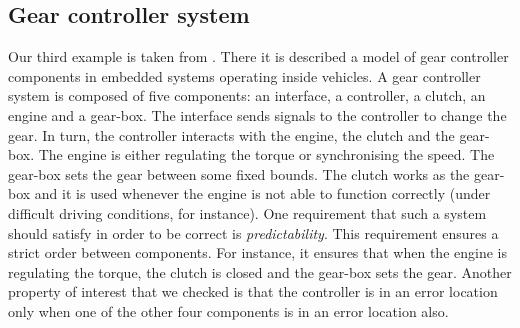 \documentclass{LMCS}
\newcommand{\mycomment}[1]{}
\theoremstyle{plain}\newtheorem{remark}[thm]{Remark}
\theoremstyle{plain}\newtheorem{example}[thm]{Example}
\begin{document}
\subsection{Gear controller system} 
Our third example is taken from \cite{gear}. There it is described a
model of gear controller components in embedded systems operating
inside vehicles. A gear controller system is composed of five
components: an interface, a controller, a clutch, an engine and a
gear-box. The interface sends signals to the controller to change the
gear. In turn, the controller interacts with the engine, the clutch
and the gear-box. The engine is either regulating the torque or
synchronising the speed. The gear-box sets the gear between some fixed
bounds. The clutch works as the gear-box and it is used whenever the
engine is not able to function correctly (under difficult driving
conditions, for instance). One requirement that such a system should
satisfy in order to be correct is \textit{predictability}. This
requirement ensures a strict order between components. For instance,
it ensures that when the engine is regulating the torque, the clutch
is closed and the gear-box sets the gear. Another property of interest
that we checked is that the controller is in an error location only when
one of the other four components is in an error location also.
\mycomment{
We abstracted this system from the data variables and considered six state properties: \\
\begin{center}
GearConrol.CCloseError  $\rightarrow$ Clutch.ErrorClose \\
GearConrol.COpenError  $\rightarrow$ Clutch.ErrorOpen \\
GearConrol.GSetError  $\rightarrow$ GearBox.ErrorIdle \\
GearConrol.GNeuError  $\rightarrow$ GearBox.ErrorNeu \\
Engine.Torque  $\rightarrow$ Clutch.Closed \\
$\bigwedge_i$ (GearConrol.Gear $\wedge$ Interface.Gear$i$ $\rightarrow$ Engine.Torque) 
\end{center}} 
\end{document}

